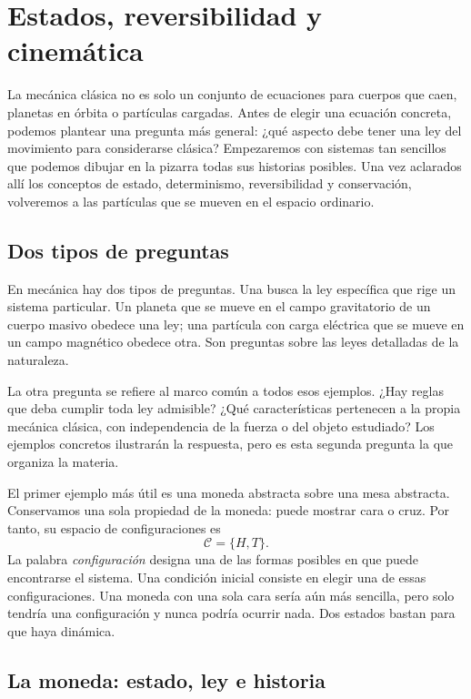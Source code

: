 \chapter{Estados, reversibilidad y cinemática}

La mecánica clásica no es solo un conjunto de ecuaciones para cuerpos que caen,
planetas en órbita o partículas cargadas. Antes de elegir una ecuación concreta,
podemos plantear una pregunta más general: ¿qué aspecto debe tener una ley del
movimiento para considerarse clásica? Empezaremos con sistemas tan sencillos que
podemos dibujar en la pizarra todas sus historias posibles. Una vez aclarados allí
los conceptos de estado, determinismo, reversibilidad y conservación, volveremos a
las partículas que se mueven en el espacio ordinario.

\section{Dos tipos de preguntas}

En mecánica hay dos tipos de preguntas. Una busca la ley específica que rige un
sistema particular. Un planeta que se mueve en el campo gravitatorio de un cuerpo
masivo obedece una ley; una partícula con carga eléctrica que se mueve en un
campo magnético obedece otra. Son preguntas sobre las leyes detalladas de la
naturaleza.

La otra pregunta se refiere al marco común a todos esos ejemplos. ¿Hay reglas
que deba cumplir toda ley admisible? ¿Qué características pertenecen a la propia
mecánica clásica, con independencia de la fuerza o del objeto estudiado? Los
ejemplos concretos ilustrarán la respuesta, pero es esta segunda pregunta la que
organiza la materia.

El primer ejemplo más útil es una moneda abstracta sobre una mesa abstracta.
Conservamos una sola propiedad de la moneda: puede mostrar cara o cruz. Por tanto,
su espacio de configuraciones es
\begin{equation}
  \mathcal C=\{H,T\}.
\end{equation}
La palabra \emph{configuración} designa una de las formas posibles en que
puede encontrarse el sistema. Una condición inicial consiste en elegir una de
essas configuraciones. Una moneda con una sola cara sería aún más sencilla, pero
solo tendría una configuración y nunca podría ocurrir nada. Dos estados bastan
para que haya dinámica.

\section{La moneda: estado, ley e historia}

